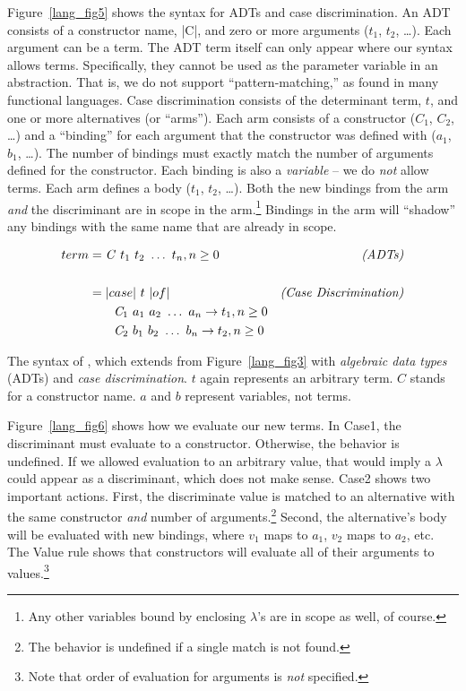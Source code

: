 \documentclass[12pt]{report}
\begin{document}
Figure~\ref{lang_fig5} shows the syntax for ADTs and case
discrimination. An ADT consists of a constructor name, |C|, and zero
or more arguments ($t_1$, $t_2$, \ldots). Each argument can be a
term. The ADT term itself can only appear where our syntax allows
terms. Specifically, they cannot be used as the parameter variable in
an abstraction. That is, we do not support ``pattern-matching,'' as
found in many functional languages. Case discrimination consists of
the determinant term, $t$, and one or more alternatives (or
``arms''). Each arm consists of a constructor ($C_1$, $C_2$, \ldots)
and a ``binding'' for each argument that the constructor was defined
with ($a_1$, $b_1$, \ldots). The number of bindings must exactly match
the number of arguments defined for the constructor. Each binding is
also a \emph{variable} -- we do \emph{not} allow terms. Each arm
defines a body ($t_1$, $t_2$, \ldots). Both the new bindings from the
arm \emph{and} the discriminant are in scope in the arm.\footnote{Any
  other variables bound by enclosing $\lambda$'s are in scope as well,
  of course.}  Bindings in the arm will ``shadow'' any bindings with
the same name that are already in scope.

\begin{myfig}[tbh]
  \begin{minipage}{3in}
  \begin{align*}
    term &= \mathit{C}\ t_1\ t_2\ \ldots\ t_n, n \ge 0 & \hfil\text{\emph{(ADTs)}} \\ \\
      &= |case|\ t\ |of| & \hfil\text{\emph{(Case Discrimination)}} \\
      & \qquad\mathit{C}_1\ a_1\ a_2\ \ldots\ a_n \rightarrow t_1, n \ge 0 \\
      & \qquad\mathit{C}_2\ b_1\ b_2\ \ldots\ b_n \rightarrow t_2, n \ge 0 
  \end{align*}
  \end{minipage}
  \caption{The syntax of \lamC, which extends \lamA from
    Figure~\ref{lang_fig3} with \emph{algebraic data types} (ADTs) and
    \emph{case discrimination}. $t$ again represents an arbitrary
    term. $C$ stands for a constructor name. $a$ and $b$ represent
    variables, not terms.}
  \label{lang_fig5}
\end{myfig}

Figure~\ref{lang_fig6} shows how we evaluate our new terms. In {\sc
  Case1}, the discriminant must evaluate to a constructor. Otherwise,
the behavior is undefined. If we allowed evaluation to an arbitrary
value, that would imply a $\lambda$ could appear as a discriminant,
which does not make sense. {\sc Case2} shows two important
actions. First, the discriminate value is matched to an alternative
with the same constructor \emph{and} number of arguments.\footnote{The
  behavior is undefined if a single match is not found.}  Second, the
alternative's body will be evaluated with new bindings, where $v_1$
maps to $a_1$, $v_2$ maps to $a_2$, etc. The {\sc Value} rule shows
that constructors will evaluate all of their arguments to
values.\footnote{Note that order of evaluation for arguments is
  \emph{not} specified.}
\end{document}
